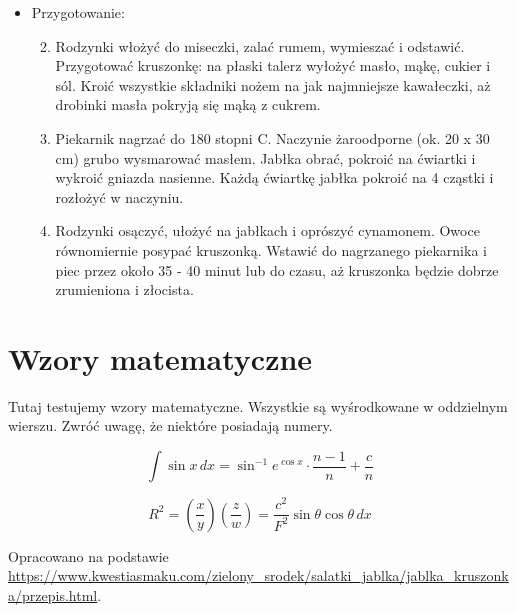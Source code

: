 \begin{itemize}
    \item {Przygotowanie:}
    \begin{enumerate}
    \setcounter{enumi}{1}
        \item Rodzynki włożyć do miseczki, zalać rumem, wymieszać i odstawić. Przygotować kruszonkę: na płaski talerz wyłożyć masło, mąkę, cukier i sól. Kroić wszystkie składniki nożem na jak najmniejsze kawałeczki, aż drobinki masła pokryją się mąką z cukrem.
        \item Piekarnik nagrzać do 180 stopni C. Naczynie żaroodporne (ok. 20 x 30 cm) grubo wysmarować masłem. Jabłka obrać, pokroić na ćwiartki i wykroić gniazda nasienne. Każdą ćwiartkę jabłka pokroić na 4 cząstki i rozłożyć w naczyniu.
        \item Rodzynki osączyć, ułożyć na jabłkach i oprószyć cynamonem. Owoce równomiernie posypać kruszonką. Wstawić do nagrzanego piekarnika i piec przez około 35 - 40 minut lub do czasu, aż kruszonka będzie dobrze zrumieniona i złocista.
    \end{enumerate}
\end{itemize}

\section{Wzory matematyczne}
Tutaj testujemy wzory matematyczne. Wszystkie są wyśrodkowane w oddzielnym wierszu. Zwróć uwagę, że niektóre posiadają numery.

\[
\int \sin x \,dx = \sin^{-1} e^{\cos x} \cdot \frac{n-1}{n} + \frac{c}{n}
\]

\[
R^2 = \left( \frac{x}{y} \right) \left( \frac{z}{w} \right) = \frac{c^2}{F^2} \sin \theta \cos \theta \,dx
\]

Opracowano na podstawie \url{https://www.kwestiasmaku.com/zielony_srodek/salatki_jablka/jablka_kruszonka/przepis.html}.


